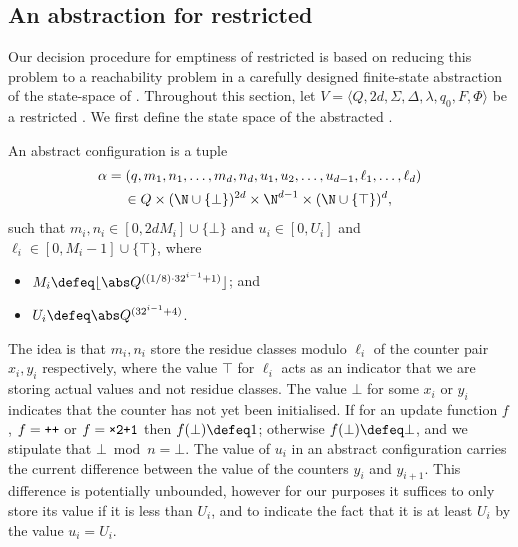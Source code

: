 
\subsection{An abstraction for restricted \laVASS}

Our decision procedure for emptiness of restricted \laVASS is based on
reducing this problem to a reachability problem in a
carefully designed finite-state abstraction of the state-space of
\laVASS. Throughout this section, let $V=\langle Q,2d,
\Sigma,\Delta,\lambda,q_0,F,\Phi\rangle$ be a restricted \laVASS.  We
first define the state space of the abstracted \laVASS.
%
\begin{definition}
  An abstract configuration is a tuple
%
  \begin{multline*}
  \alpha=(q,
  m_1,n_1,\dots,m_{d},n_{d},u_1,u_2,\dots,u_{d-1},\ell_1,\dots,\ell_d)\\
  \in Q\times (\N\cup\{\bot\})^{2d} \times \N^{d-1}\times(\N \cup \{ \top \})^{d},
  \end{multline*}
  such that $m_i,n_i \in [0,2dM_i] \cup \{ \bot \}$
  and $u_i \in [0,U_i]$ and $\ell_i\in[0,M_i-1] \cup \{\top\}$,
  where
  \begin{itemize}
	\item $M_i \defeq \floor{\abs Q^{((1/8)\cdot 32^{i-1} + 1)}}$; and
	\item $U_i \defeq \abs Q^{(32^{i-1}+4)}$.
  \end{itemize}
\end{definition}
%
The idea is that $m_i,n_i$ store the residue classes modulo $\ell_i$
of the counter pair $x_i,y_i$ respectively, where the value $\top$ for
$\ell_i$ acts as an indicator that we are storing actual values and
not residue classes. The value $\bot$ for some $x_i$ or $y_i$
indicates that the counter has not yet been initialised. If for an
update function $f$, $f={\normalfont{\texttt{{++}}}}$ or $f=\wTTPO$ then $f(\bot)\defeq
1$; otherwise $f(\bot) \defeq \bot$, and we stipulate that $\bot \bmod
n = \bot$. The value of $u_i$ in an abstract configuration carries the
current difference between the value of the counters $y_{i}$ and
$y_{i+1}$. This difference is potentially unbounded, however for our
purposes it suffices to only store its value if it is less than $U_i$,
and to indicate the fact that it is at least $U_i$ by the value
$u_i=U_i$.

